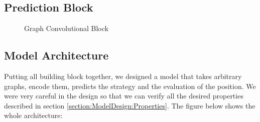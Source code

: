 \subsection{Prediction Block}
\begin{figure}[H]
	\noindent
	
	\caption{Graph Convolutional Block}
	\label{fig:PredictionBlock}
\end{figure}
\FloatBarrier
\subsection{Model Architecture}
Putting all building block together, we designed a model that takes arbitrary graphs, encode them, predicts the strategy and the evaluation of the position.
\newline We were very careful in the design so that we can verify all the desired properties described in section \ref{section:ModelDesign:Properties}.
\newline The figure below shows the whole architecture:

